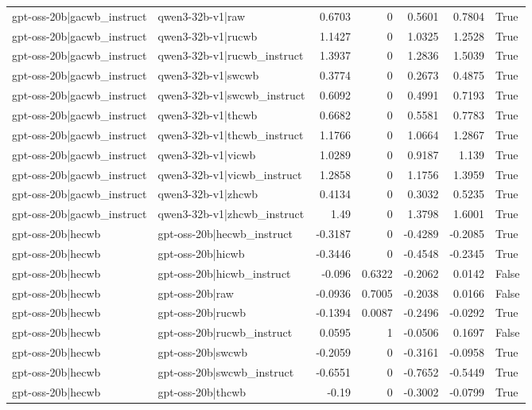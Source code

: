 \begin{table}
\begin{tabular}{l l r r r r l}
gpt-oss-20b|gacwb_instruct & qwen3-32b-v1|raw & 0.6703 & 0 & 0.5601 & 0.7804 & True \\
gpt-oss-20b|gacwb_instruct & qwen3-32b-v1|rucwb & 1.1427 & 0 & 1.0325 & 1.2528 & True \\
gpt-oss-20b|gacwb_instruct & qwen3-32b-v1|rucwb_instruct & 1.3937 & 0 & 1.2836 & 1.5039 & True \\
gpt-oss-20b|gacwb_instruct & qwen3-32b-v1|swcwb & 0.3774 & 0 & 0.2673 & 0.4875 & True \\
gpt-oss-20b|gacwb_instruct & qwen3-32b-v1|swcwb_instruct & 0.6092 & 0 & 0.4991 & 0.7193 & True \\
gpt-oss-20b|gacwb_instruct & qwen3-32b-v1|thcwb & 0.6682 & 0 & 0.5581 & 0.7783 & True \\
gpt-oss-20b|gacwb_instruct & qwen3-32b-v1|thcwb_instruct & 1.1766 & 0 & 1.0664 & 1.2867 & True \\
gpt-oss-20b|gacwb_instruct & qwen3-32b-v1|vicwb & 1.0289 & 0 & 0.9187 & 1.139 & True \\
gpt-oss-20b|gacwb_instruct & qwen3-32b-v1|vicwb_instruct & 1.2858 & 0 & 1.1756 & 1.3959 & True \\
gpt-oss-20b|gacwb_instruct & qwen3-32b-v1|zhcwb & 0.4134 & 0 & 0.3032 & 0.5235 & True \\
gpt-oss-20b|gacwb_instruct & qwen3-32b-v1|zhcwb_instruct & 1.49 & 0 & 1.3798 & 1.6001 & True \\
gpt-oss-20b|hecwb & gpt-oss-20b|hecwb_instruct & -0.3187 & 0 & -0.4289 & -0.2085 & True \\
gpt-oss-20b|hecwb & gpt-oss-20b|hicwb & -0.3446 & 0 & -0.4548 & -0.2345 & True \\
gpt-oss-20b|hecwb & gpt-oss-20b|hicwb_instruct & -0.096 & 0.6322 & -0.2062 & 0.0142 & False \\
gpt-oss-20b|hecwb & gpt-oss-20b|raw & -0.0936 & 0.7005 & -0.2038 & 0.0166 & False \\
gpt-oss-20b|hecwb & gpt-oss-20b|rucwb & -0.1394 & 0.0087 & -0.2496 & -0.0292 & True \\
gpt-oss-20b|hecwb & gpt-oss-20b|rucwb_instruct & 0.0595 & 1 & -0.0506 & 0.1697 & False \\
gpt-oss-20b|hecwb & gpt-oss-20b|swcwb & -0.2059 & 0 & -0.3161 & -0.0958 & True \\
gpt-oss-20b|hecwb & gpt-oss-20b|swcwb_instruct & -0.6551 & 0 & -0.7652 & -0.5449 & True \\
gpt-oss-20b|hecwb & gpt-oss-20b|thcwb & -0.19 & 0 & -0.3002 & -0.0799 & True \\

\end{tabular}
\end{table}
